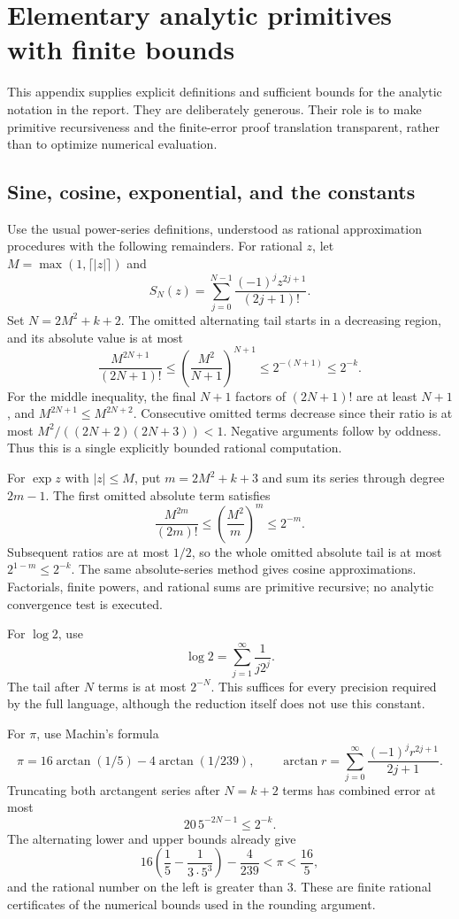 \section{Elementary analytic primitives with finite bounds}
\label{app:primitives}

This appendix supplies explicit definitions and sufficient bounds for the
analytic notation in the report. They are deliberately generous. Their
role is to make primitive recursiveness and the finite-error proof
translation transparent, rather than to optimize numerical evaluation.

\subsection{Sine, cosine, exponential, and the constants}

Use the usual power-series definitions, understood as rational
approximation procedures with the following remainders. For rational $z$,
let $M=\max(1,\lceil|z|\rceil)$ and
\[
 S_N(z)=\sum_{j=0}^{N-1}\frac{(-1)^jz^{2j+1}}{(2j+1)!}.
\]
Set $N=2M^2+k+2$. The omitted alternating tail starts in a decreasing
region, and its absolute value is at most
\[
 \frac{M^{2N+1}}{(2N+1)!}
 \le\left(\frac{M^2}{N+1}\right)^{N+1}
 \le2^{-(N+1)}\le2^{-k}.
\]
For the middle inequality, the final $N+1$ factors of $(2N+1)!$ are
at least $N+1$, and $M^{2N+1}\le M^{2N+2}$. Consecutive omitted terms
decrease since their ratio is at most
$M^2/((2N+2)(2N+3))<1$. Negative arguments follow by oddness.
Thus this is a single explicitly bounded rational computation.

For $\exp z$ with $|z|\le M$, put $m=2M^2+k+3$ and sum its series
through degree $2m-1$. The first omitted absolute term satisfies
\[
 \frac{M^{2m}}{(2m)!}
 \le\left(\frac{M^2}{m}\right)^m\le2^{-m}.
\]
Subsequent ratios are at most $1/2$, so the whole omitted absolute tail
is at most $2^{1-m}\le2^{-k}$. The same absolute-series method gives
cosine approximations. Factorials, finite powers, and rational sums are
primitive recursive; no analytic convergence test is executed.

For $\log2$, use
\[
 \log2=\sum_{j=1}^{\infty}\frac1{j2^j}.
\]
The tail after $N$ terms is at most $2^{-N}$. This suffices for every
precision required by the full language, although the reduction itself
does not use this constant.

For $\pi$, use Machin's formula
\begin{equation}\label{eq:machin}
 \pi=16\arctan(1/5)-4\arctan(1/239),
 \qquad
 \arctan r=\sum_{j=0}^{\infty}\frac{(-1)^jr^{2j+1}}{2j+1}.
\end{equation}
Truncating both arctangent series after $N=k+2$ terms has combined error
at most
\[
 20\,5^{-2N-1}\le2^{-k}.
\]
The alternating lower and upper bounds already give
\[
 16\left(\frac15-\frac1{3\cdot5^3}\right)-\frac4{239}
 <\pi<\frac{16}{5},
\]
and the rational number on the left is greater than $3$.
These are finite rational certificates of the numerical bounds used in
the rounding argument.

